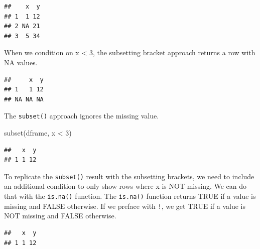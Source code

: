 \documentclass[
]{book}
\newenvironment{Shaded}{\begin{snugshade}}{\end{snugshade}}
\newcommand{\DecValTok}[1]{\textcolor[rgb]{0.00,0.00,0.81}{#1}}
\newcommand{\FunctionTok}[1]{\textcolor[rgb]{0.00,0.00,0.00}{#1}}
\newcommand{\NormalTok}[1]{#1}
\newcommand{\SpecialCharTok}[1]{\textcolor[rgb]{0.00,0.00,0.00}{#1}}
\begin{document}
\begin{verbatim}
##    x  y
## 1  1 12
## 2 NA 21
## 3  5 34
\end{verbatim}

When we condition on x \textless{} 3, the subsetting bracket approach returns a row with NA values.

\begin{Shaded}
\end{Shaded}

\begin{verbatim}
##     x  y
## 1   1 12
## NA NA NA
\end{verbatim}

The \texttt{subset()} approach ignores the missing value.

\begin{Shaded}
\begin{Highlighting}[]
\FunctionTok{subset}\NormalTok{(dframe, x }\SpecialCharTok{\textless{}} \DecValTok{3}\NormalTok{)}
\end{Highlighting}
\end{Shaded}

\begin{verbatim}
##   x  y
## 1 1 12
\end{verbatim}

To replicate the \texttt{subset()} result with the subsetting brackets, we need to include an additional condition to only show rows where x is NOT missing. We can do that with the \texttt{is.na()} function. The \texttt{is.na()} function returns TRUE if a value is missing and FALSE otherwise. If we preface with \texttt{!}, we get TRUE if a value is NOT missing and FALSE otherwise.

\begin{Shaded}
\end{Shaded}

\begin{verbatim}
##   x  y
## 1 1 12
\end{verbatim}
\end{document}
